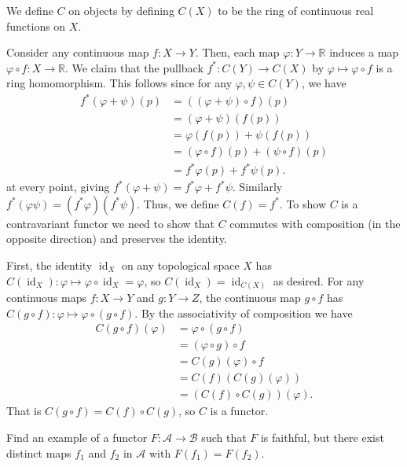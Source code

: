 \documentclass[12 pt, letterpaper]{hmcpset}
\begin{document}
\begin{solution}
	We define $C$ on objects by defining $C(X)$ to be the ring of continuous real functions on $X$. 

	Consider any continuous map $f : X \to Y$. Then, each map $\varphi : Y \to \mathbb{R}$ induces a map $\varphi \circ f : X \to \mathbb{R}$. We claim that the pullback $f^{*} : C(Y) \to C(X)$ by $\varphi \mapsto \varphi \circ f$ is a ring homomorphism. This follows since for any $\varphi, \psi \in C(Y)$, we have
	\begin{align*}
		f^{*}(\varphi + \psi)(p) & = ((\varphi + \psi) \circ f)(p) \\
				      & = (\varphi + \psi)(f(p)) \\
				      & = \varphi(f(p)) + \psi(f(p)) \\
				      & = (\varphi \circ f)(p) + (\psi \circ f)(p) \\
				      & = f^{*} \varphi(p) + f^{*} \psi(p).
	\end{align*}
	at every point, giving $f^{*}(\varphi + \psi) = f^{*} \varphi + f^{*} \psi$. Similarly $f^{*} (\varphi \psi) = (f^{*} \varphi) (f^{*} \psi)$. Thus, we define $C(f) = f^{*}$. To show $C$ is a contravariant functor we need to show that $C$ commutes with composition (in the opposite direction) and preserves the identity.

	First, the identity $\operatorname{id}_{X}$ on any topological space $X$ has $C(\operatorname{id}_{X}) : \varphi \mapsto \varphi \circ \operatorname{id}_{X} = \varphi$, so $C(\operatorname{id}_{X}) = \operatorname{id}_{C(X)}$ as desired. For any continuous maps $f : X \to Y$ and $g : Y \to Z$, the continuous map $g \circ f$ has $C(g \circ f) : \varphi \mapsto \varphi \circ (g \circ f)$. By the associativity of composition we have
	\begin{align*}
		C(g \circ f)(\varphi) & = \varphi \circ (g \circ f) \\
				   & = (\varphi \circ g) \circ f \\
				   & = C(g)(\varphi) \circ f \\
				   & = C(f)(C(g)(\varphi)) \\
				   & = (C(f) \circ C(g))(\varphi).
	\end{align*}
	That is $C(g \circ f) = C(f) \circ C(g)$, so $C$ is a functor.
\end{solution}

\pagebreak

\begin{problem}
	Find an example of a functor $F : \mathscr{A} \to \mathscr{B}$ such that $F$ is faithful, but there exist distinct maps $f_{1}$ and $f_{2}$ in $\mathscr{A}$ with $F(f_{1}) = F(f_{2})$. 
\end{problem}
\end{document}
